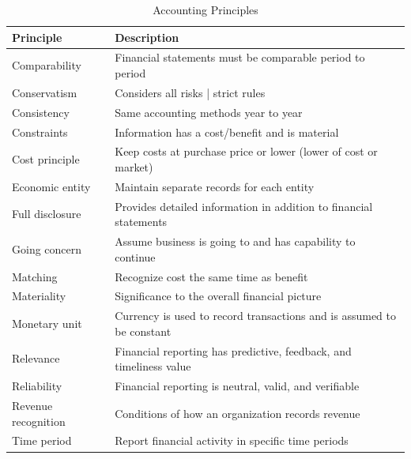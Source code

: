 \begin{table}[H]
    \centering
    \begin{tabular}{|p{}|p{}|}
        \hline
        \textbf{Principle}  & \textbf{Description}                                                  \\
        \hline
        Comparability       & Financial statements must be comparable period to period              \\
        \hline
        Conservatism        & Considers all risks | strict rules                                    \\
        \hline
        Consistency         & Same accounting methods year to year                                  \\
        \hline
        Constraints         & Information has a cost/benefit and is material                        \\
        \hline
        Cost principle      & Keep costs at purchase price or lower (lower of cost or market)       \\
        \hline
        Economic entity     & Maintain separate records for each entity                             \\
        \hline
        Full disclosure     & Provides detailed information in addition to financial statements     \\
        \hline
        Going concern       & Assume business is going to and has capability to continue            \\
        \hline
        Matching            & Recognize cost the same time as benefit                               \\
        \hline
        Materiality         & Significance to the overall financial picture                         \\
        \hline
        Monetary unit       & Currency is used to record transactions and is assumed to be constant \\
        \hline
        Relevance           & Financial reporting has predictive, feedback, and timeliness value    \\
        \hline
        Reliability         & Financial reporting is neutral, valid, and verifiable                 \\
        \hline
        Revenue recognition & Conditions of how an organization records revenue                     \\
        \hline
        Time period         & Report financial activity in specific time periods                    \\
        \hline
    \end{tabular}
    \caption{Accounting Principles}
\end{table}


\newpage
